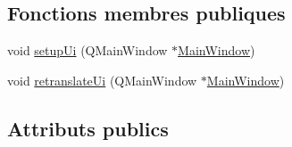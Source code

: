 \subsection*{Fonctions membres publiques}
\begin{DoxyCompactItemize}
\item 
void \hyperlink{classUi__MainWindow_acf4a0872c4c77d8f43a2ec66ed849b58}{setup\+Ui} (Q\+Main\+Window $\ast$\hyperlink{classMainWindow}{Main\+Window})
\item 
void \hyperlink{classUi__MainWindow_a097dd160c3534a204904cb374412c618}{retranslate\+Ui} (Q\+Main\+Window $\ast$\hyperlink{classMainWindow}{Main\+Window})
\end{DoxyCompactItemize}
\subsection*{Attributs publics}

